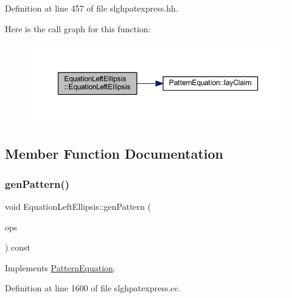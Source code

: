 Definition at line 457 of file slghpatexpress.\+hh.

Here is the call graph for this function\+:
\nopagebreak
\begin{figure}[H]
\begin{center}
\leavevmode
\includegraphics[width=350pt]{class_equation_left_ellipsis_a2c1fa90dcbd3861542b0bb7374262fa4_cgraph}
\end{center}
\end{figure}


\subsection{Member Function Documentation}
\mbox{\label{class_equation_left_ellipsis_a8d2e9982b85b000ff611204134a01061}} 
\subsubsection{\texorpdfstring{genPattern()}{genPattern()}}
{\footnotesize\ttfamily void Equation\+Left\+Ellipsis\+::gen\+Pattern (\begin{DoxyParamCaption}\item[{const vector$<$ \mbox{\hyperlink{class_token_pattern}{Token\+Pattern}} $>$ \&}]{ops }\end{DoxyParamCaption}) const\hspace{0.3cm}{\ttfamily [virtual]}}



Implements \mbox{\hyperlink{class_pattern_equation_a9838e5bfe5b6013c99567628a6364bfd}{Pattern\+Equation}}.



Definition at line 1600 of file slghpatexpress.\+cc.

